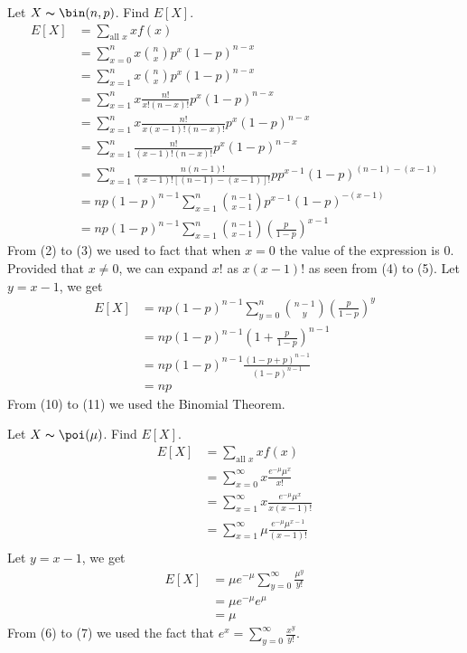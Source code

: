 Let $ X \thicksim \bin(n,p) $. Find $ E[X] $.
\setcounter{equation}{0}
\begin{align}
    E[X]&=\sum\limits_{\text{all } x}x f(x)\\
    &=\sum\limits_{x=0}^{n}x \binom{n}{x}p^x(1-p)^{n-x}\\
    &=\sum\limits_{x=1}^{n}x \binom{n}{x}p^x(1-p)^{n-x}\\
    &=\sum\limits_{x=1}^{n}x \frac{n!}{x!(n-x)!}p^x(1-p)^{n-x}\\
    &=\sum\limits_{x=1}^{n}x \frac{n!}{x(x-1)!(n-x)!}p^x(1-p)^{n-x}\\
    &=\sum\limits_{x=1}^{n}\frac{n!}{(x-1)!(n-x)!}p^x(1-p)^{n-x}\\
    &=\sum\limits_{x=1}^{n}\frac{n(n-1)!}{(x-1)![(n-1)-(x-1)]!}pp^{x-1}(1-p)^{(n-1)-(x-1)}\\
    &=np(1-p)^{n-1}\sum\limits_{x=1}^{n}\binom{n-1}{x-1}p^{x-1}(1-p)^{-(x-1)}\\
    &=np(1-p)^{n-1}\sum\limits_{x=1}^{n}\binom{n-1}{x-1}\left(\frac{p}{1-p}\right)^{x-1}
\end{align}
From (2) to (3) we used to fact that when $ x=0 $ the value of the expression 
is $ 0 $. Provided that $ x\neq 0 $, we can expand $ x! $ as $ x(x-1)! $ as
seen from (4) to (5). Let $ y=x-1 $, we get
\begin{align}
    E[X]&=np(1-p)^{n-1}\sum\limits_{y=0}^{n}\binom{n-1}{y}\left(\frac{p}{1-p}\right)^{y}\\
    &=np(1-p)^{n-1}\left(1+\frac{p}{1-p}\right)^{n-1}\\
    &=np(1-p)^{n-1}\frac{(1-p+p)^{n-1}}{(1-p)^{n-1}}\\
    &=np
\end{align}
From (10) to (11) we used the Binomial Theorem.

Let $ X \thicksim \poi(\mu) $. Find $ E[X] $.
\setcounter{equation}{0}
\begin{align}
    E[X]&=\sum\limits_{\text{all } x}x f(x)\\
    &=\sum\limits_{x=0}^{\infty} x \frac{e^{-\mu}\mu^x}{x!}\\
    &=\sum\limits_{x=1}^{\infty} x \frac{e^{-\mu}\mu^x}{x(x-1)!}\\
    &=\sum\limits_{x=1}^{\infty} \mu \frac{e^{-\mu}\mu^{x-1}}{(x-1)!}\\
\end{align}
Let $ y=x-1 $, we get
\begin{align}
    E[X]&=\mu e^{-\mu}\sum\limits_{y=0}^{\infty} \frac{\mu^{y}}{y!}\\
    &=\mu e^{-\mu}e^\mu\\
    &=\mu
\end{align}
From (6) to (7) we used the fact that $ e^x=\sum\limits_{y=0}^{\infty}\frac{x^y}{y!} $.

